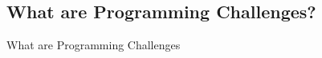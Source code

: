 \subsection{What are Programming Challenges?}
\begin{frame}{What are Programming Challenges}
\end{frame}

%
%
%
%
%

%
%
%
%
%
%
%
%



